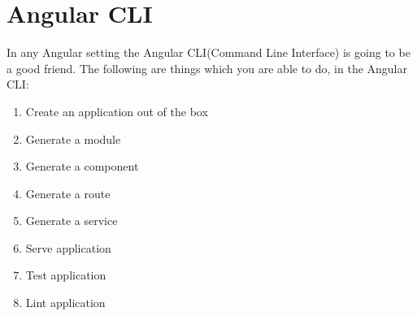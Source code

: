 \maketitle{}
\section{ Angular CLI }

In any Angular setting the Angular CLI(Command Line Interface) is going to be
a good friend. The following are things which you are able to do, in the Angular
CLI:

\begin{enumerate}
  \item Create an application out of the box
  \item Generate a module
  \item Generate a component
  \item Generate a route
  \item Generate a service
  \item Serve application
  \item Test application
  \item Lint application
\end{enumerate}
